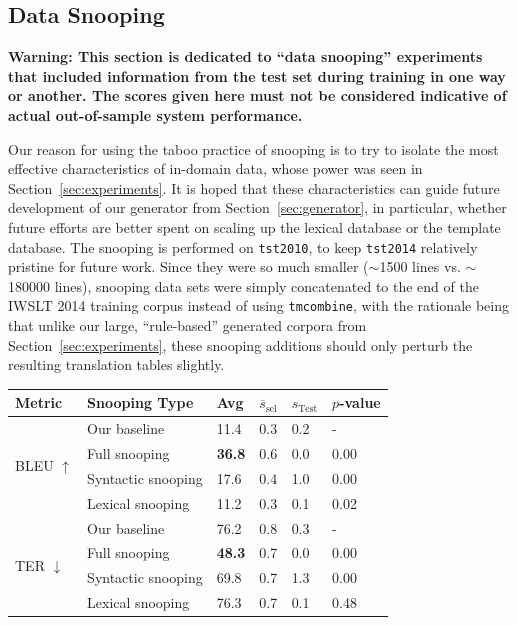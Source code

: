 {\subsection{Data Snooping}
\textbf{
Warning: This section is dedicated to ``data snooping'' experiments that included information from the test set during training in one way or another.
The scores given here must not be considered indicative of actual out-of-sample system performance.
}

Our reason for using the taboo practice of snooping is to try to isolate the most effective characteristics of in-domain data, whose power was seen in Section~\ref{sec:experiments}.
It is hoped that these characteristics can guide future development of our generator from Section~\ref{sec:generator}, in particular, whether future efforts are better spent on scaling up the lexical database or the template database.
The snooping is performed on {\small \tt tst2010}, to keep {\small \tt tst2014} relatively pristine for future work.
Since they were so much smaller ($\sim$1500 lines vs. $\sim$180000 lines), snooping data sets were simply concatenated to the end of the IWSLT 2014 training corpus instead of using {\small \tt tmcombine}, with the rationale being that unlike our large, ``rule-based'' generated corpora from Section~\ref{sec:experiments}, these snooping additions should only perturb the resulting translation tables slightly.



\begin{table}[htb]
\begin{center}
\begin{tabular}{|l|l|l|l|l|l|}
\hline
\bf Metric & \bf Snooping Type & \bf Avg & \bf $\overline{s}_{\text{sel}}$ & \bf $s_{\text{Test}}$ & \bf $p$-value \\
\hline
\multirow{4}{*}{BLEU $\uparrow$}
& Our baseline & 11.4 & 0.3 & 0.2 & - \\
& Full snooping & \textbf{36.8} & 0.6 & 0.0 & 0.00 \\
& Syntactic snooping & 17.6 & 0.4 & 1.0 & 0.00 \\
& Lexical snooping & 11.2 & 0.3 & 0.1 & 0.02 \\
\hline
\multirow{4}{*}{TER $\downarrow$}
& Our baseline & 76.2 & 0.8 & 0.3 & - \\
& Full snooping & \textbf{48.3} & 0.7 & 0.0 & 0.00 \\
& Syntactic snooping & 69.8 & 0.7 & 1.3 & 0.00 \\
& Lexical snooping & 76.3 & 0.7 & 0.1 & 0.48 \\
\hline
\end{tabular}
\end{center}


\end{table}}
